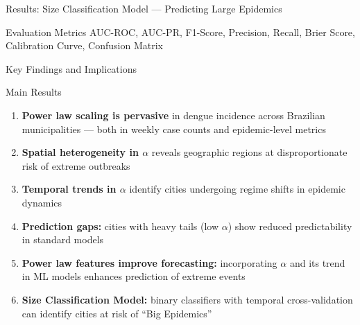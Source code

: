 \documentclass[10pt,aspectratio=169]{beamer}
\begin{document}
\begin{frame}{Results: Size Classification Model --- Predicting Large Epidemics}
\vspace{0.2cm}

\begin{block}{Evaluation Metrics}
AUC-ROC, AUC-PR, F1-Score, Precision, Recall, Brier Score, Calibration Curve, Confusion Matrix
\end{block}
\end{frame}

\begin{frame}{Key Findings and Implications}
\begin{block}{Main Results}
\begin{enumerate}
    \item \textbf{Power law scaling is pervasive} in dengue incidence across Brazilian municipalities --- both in weekly case counts and epidemic-level metrics
    \item \textbf{Spatial heterogeneity in $\alpha$} reveals geographic regions at disproportionate risk of extreme outbreaks
    \item \textbf{Temporal trends in $\alpha$} identify cities undergoing regime shifts in epidemic dynamics
    \item \textbf{Prediction gaps:} cities with heavy tails (low $\alpha$) show reduced predictability in standard models
    \item \textbf{Power law features improve forecasting:} incorporating $\alpha$ and its trend in ML models enhances prediction of extreme events
    \item \textbf{Size Classification Model:} binary classifiers  with temporal cross-validation can identify cities at risk of ``Big Epidemics''
\end{enumerate}
\end{block}

\end{frame}
\end{document}
